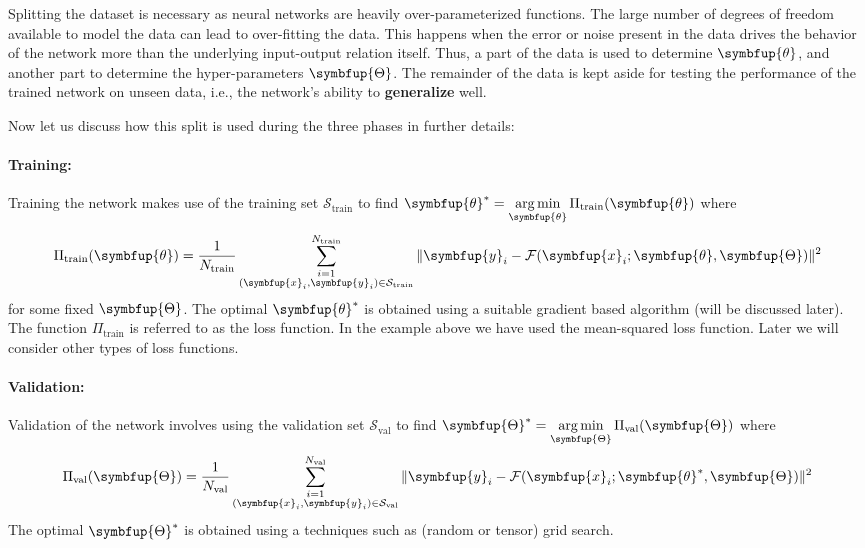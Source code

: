 \documentclass[11pt]{extarticle}
\newcommand{\ds}{\displaystyle}
\newcommand{\vx}{\symbfup{x}}
\newcommand{\vy}{\symbfup{y}}
\theoremstyle{definition}
\newcommand{\btheta}{\symbfup{\theta}}
\newcommand{\Hp}{\symbfup{\Theta}}
\DeclareMathOperator*{\amin}{\rm{\arg \min}}
\begin{document}
Splitting the dataset is necessary as neural networks are heavily over-parameterized functions. The large number of degrees of freedom available to model the data can lead to over-fitting the data. This happens when the error or noise present in the data drives the behavior of the network more than the underlying input-output relation itself. Thus, a part of the data is used to determine $\btheta$, and another part to determine the hyper-parameters $\Hp$. The remainder of the data is kept aside for testing the performance 
 of the trained network on unseen data, i.e., the network's ability to \textbf{generalize} well.

Now let us discuss how this split is used during the three phases in further details:

\paragraph{Training:}
Training the network makes use of the training set $\mathcal{S}_{\text{train}}$ to find $\ds\btheta^* = \amin_{\btheta} \Pi_\text{train}(\btheta)$ where
\begin{align*}
  \Pi_\text{train} (\btheta)= \frac{1}{N_\text{train}} \sum_{\substack{i=1\\(\vx_i,\vy_i) \in \mathcal{S}_{\text{train}}}}^{N_\text{train}} \|\vy_i - \mathcal{F}(\vx_i; \btheta, \Hp)\|^2
\end{align*}
for some fixed $\Hp$. The optimal $\btheta^*$ is obtained using a suitable gradient based algorithm (will be discussed later). The function $\Pi_\text{train}$ is referred to as the loss function. In the example above we have used the mean-squared loss function. Later we will consider other types of loss functions. 

\paragraph{Validation:}
Validation of the network involves using the validation set $\mathcal{S}_{\text{val}}$ to find $\ds\Hp^* = \amin_{\Hp} \Pi_\text{val}(\Hp)$ where
\begin{align*}
  \Pi_\text{val} (\Hp)= \frac{1}{N_\text{val}} \sum_{\substack{i=1\\(\vx_i,\vy_i) \in \mathcal{S}_{\text{val}}}}^{N_\text{val}} \|\vy_i - \mathcal{F}(\vx_i; \btheta^*, \Hp)\|^2
\end{align*}
The optimal $\Hp^*$ is obtained using a techniques such as (random or tensor) grid search.
\end{document}
